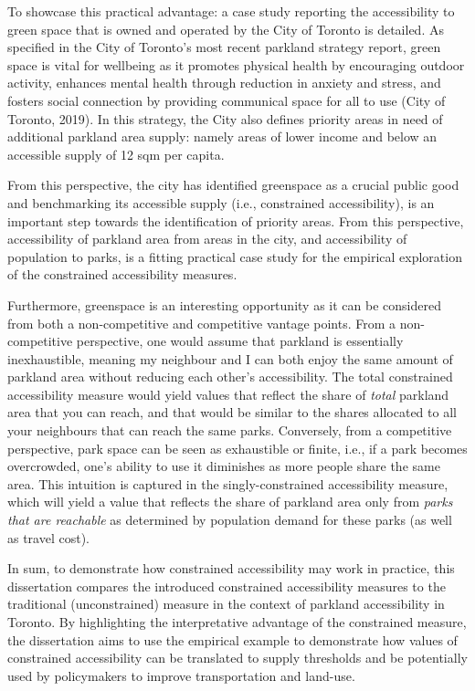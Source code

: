 \documentclass[
11pt, %
oneside, %
english, %
singlespacing, %
]{macthesis} %
\begin{document}
To showcase this practical advantage: a case study reporting the accessibility to green space that is owned and operated by the City of Toronto is detailed. As specified in the City of Toronto's most recent parkland strategy report, green space is vital for wellbeing as it promotes physical health by encouraging outdoor activity, enhances mental health through reduction in anxiety and stress, and fosters social connection by providing communical space for all to use (City of Toronto, 2019). In this strategy, the City also defines priority areas in need of additional parkland area supply: namely areas of lower income and below an accessible supply of 12 sqm per capita.

From this perspective, the city has identified greenspace as a crucial public good and benchmarking its accessible supply (i.e., constrained accessibility), is an important step towards the identification of priority areas. From this perspective, accessibility of parkland area from areas in the city, and accessibility of population to parks, is a fitting practical case study for the empirical exploration of the constrained accessibility measures.

Furthermore, greenspace is an interesting opportunity as it can be considered from both a non-competitive and competitive vantage points. From a non-competitive perspective, one would assume that parkland is essentially inexhaustible, meaning my neighbour and I can both enjoy the same amount of parkland area without reducing each other's accessibility. The total constrained accessibility measure would yield values that reflect the share of \emph{total} parkland area that you can reach, and that would be similar to the shares allocated to all your neighbours that can reach the same parks. Conversely, from a competitive perspective, park space can be seen as exhaustible or finite, i.e., if a park becomes overcrowded, one's ability to use it diminishes as more people share the same area. This intuition is captured in the singly-constrained accessibility measure, which will yield a value that reflects the share of parkland area only from \emph{parks that are reachable} as determined by population demand for these parks (as well as travel cost).

In sum, to demonstrate how constrained accessibility may work in practice, this dissertation compares the introduced constrained accessibility measures to the traditional (unconstrained) measure in the context of parkland accessibility in Toronto. By highlighting the interpretative advantage of the constrained measure, the dissertation aims to use the empirical example to demonstrate how values of constrained accessibility can be translated to supply thresholds and be potentially used by policymakers to improve transportation and land-use.
\end{document}
